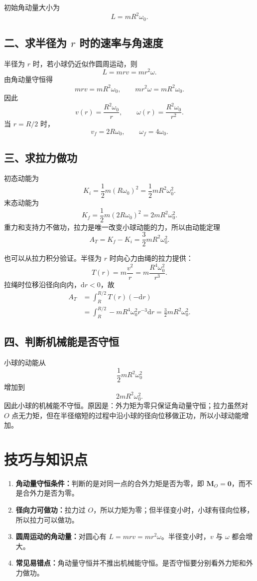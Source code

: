 \documentclass[11pt,a4paper]{ctexart}
\newcommand{\dd}{\mathrm{d}}
\begin{document}
初始角动量大小为
\[
  L=mR^2\omega_0.
\]

\subsection*{二、求半径为 $r$ 时的速率与角速度}

半径为 $r$ 时，若小球仍近似作圆周运动，则
\[
  L=mrv=m r^2\omega .
\]
由角动量守恒得
\[
  mrv=mR^2\omega_0,
  \qquad
  mr^2\omega=mR^2\omega_0.
\]
因此
\[
  \boxed{v(r)=\frac{R^2\omega_0}{r}},
  \qquad
  \boxed{\omega(r)=\frac{R^2\omega_0}{r^2}}.
\]
当 $r=R/2$ 时，
\[
  \boxed{v_f=2R\omega_0},
  \qquad
  \boxed{\omega_f=4\omega_0}.
\]

\subsection*{三、求拉力做功}

初态动能为
\[
  K_i=\frac12 m(R\omega_0)^2
      =\frac12 mR^2\omega_0^2 .
\]
末态动能为
\[
  K_f=\frac12 m(2R\omega_0)^2
      =2mR^2\omega_0^2 .
\]
重力和支持力不做功，拉力是唯一改变小球动能的力，所以由动能定理
\[
  A_T=K_f-K_i
      =\boxed{\frac32 mR^2\omega_0^2}.
\]

也可以从拉力积分验证。半径为 $r$ 时向心力由绳的拉力提供：
\[
  T(r)=m\frac{v^2}{r}
      =m\frac{R^4\omega_0^2}{r^3}.
\]
拉绳时位移沿径向向内，$\dd r<0$，故
\[
\begin{aligned}
  A_T
  &=\int_R^{R/2}T(r)(-\dd r)  \\
  &=\int_R^{R/2}-mR^4\omega_0^2r^{-3}\dd r
   =\frac32 mR^2\omega_0^2 .
\end{aligned}
\]

\subsection*{四、判断机械能是否守恒}

小球的动能从
\[
  \frac12 mR^2\omega_0^2
\]
增加到
\[
  2mR^2\omega_0^2 .
\]
因此小球的机械能不守恒。原因是：外力矩为零只保证角动量守恒；拉力虽然对 $O$ 点无力矩，但在半径缩短的过程中沿小球的径向位移做正功，所以小球动能增加。

\section*{技巧与知识点}

\begin{tipBox}
\begin{enumerate}
  \item \textbf{角动量守恒条件：}判断的是对同一点的合外力矩是否为零，即 $\bm M_O=\bm 0$，而不是合外力是否为零。
  \item \textbf{径向力可做功：}拉力过 $O$，所以力矩为零；但半径变小时，小球有径向位移，所以拉力可以做功。
  \item \textbf{圆周运动的角动量：}对圆心有 $L=mrv=mr^2\omega$。半径变小时，$v$ 与 $\omega$ 都会增大。
  \item \textbf{常见易错点：}角动量守恒并不推出机械能守恒。是否守恒要分别看外力矩和外力做功。
\end{enumerate}
\end{tipBox}
\end{document}
